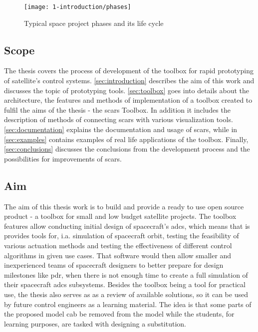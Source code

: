     \begin{figure}[h]
        \centering
        \texttt{[image: 1-introduction/phases]}
        \caption{Typical space project phases and its life cycle\cite{nguyen2000effective}}
        \label{fig:phases}
    \end{figure}

    
\subsection{Scope}
    The thesis covers the process of development of the toolbox for rapid prototyping of satellite's control systems. \autoref{sec:introduction} describes the aim of this work and discusses the topic of prototyping tools. \autoref{sec:toolbox} goes into details about the architecture, the features and methods of implementation of a toolbox created to fulfil the aims of the thesis - the \ac{scars} Toolbox. In addition it includes the description of methods of connecting \ac{scars} with various visualization tools. \autoref{sec:documentation} explains the documentation and usage of \ac{scars}, while in \autoref{sec:examples} contains examples of real life applications of the toolbox. Finally, \autoref{sec:conclusions} discusses the conclusions from the development process and the possibilities for improvements of \ac{scars}.

\subsection{Aim}\label{sec:aim}
    The aim of this thesis work is to build and provide a ready to use open source product - a toolbox for small and low budget satellite projects.  The toolbox features allow conducting initial design of spacecraft's \ac{adcs}, which means that is provides tools for, i.a. simulation of spacecraft orbit, testing the feasibility of various actuation methods and testing the effectiveness of different control algorithms in given use cases. That software would then allow smaller and inexperienced teams of spacecraft designers to better prepare for design milestones like \ac{pdr}, when there is not enough time to create a full simulation of their spacecraft \ac{adcs} subsystems. Besides the toolbox being a tool for practical use, the thesis also serves as as a review of available solutions, so it can be used by future control engineers as a learning material. The idea is that some parts of the proposed model cab be removed from the model while the students, for learning purposes, are tasked with designing a substitution.

